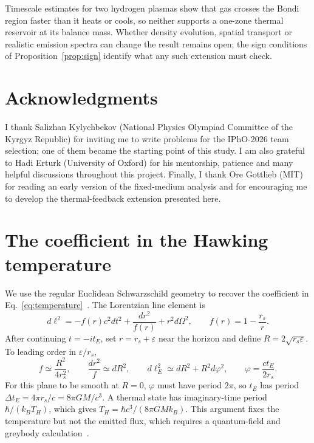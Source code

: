 \documentclass[11pt,a4paper]{article}
\begin{document}
Timescale estimates for two hydrogen plasmas show that gas crosses the Bondi region faster than it heats or cools, so neither supports a one-zone thermal reservoir at its balance mass. Whether density evolution, spatial transport or realistic emission spectra can change the result remains open; the sign conditions of Proposition~\ref{prop:sign} identify what any such extension must check.

\section*{Acknowledgments}
I thank Salizhan Kylychbekov (National Physics Olympiad Committee of the Kyrgyz Republic) for inviting me to write problems for the IPhO-2026 team selection; one of them became the starting point of this study. I am also grateful to Hadi Erturk (University of Oxford) for his mentorship, patience and many helpful discussions throughout this project. Finally, I thank Ore Gottlieb (MIT) for reading an early version of the fixed-medium analysis and for encouraging me to develop the thermal-feedback extension presented here.

\appendix
\section{The coefficient in the Hawking temperature}\label{app:temperature}
We use the regular Euclidean Schwarzschild geometry to recover the coefficient in Eq.~\eqref{eq:temperature}~\cite{gibbons,genolini}. The Lorentzian line element is
\begin{equation*}
 d\ell^2=-f(r)c^2dt^2+\frac{dr^2}{f(r)}+r^2d\Omega^2,
 \qquad f(r)=1-\frac{r_s}{r}.
\end{equation*}
After continuing $t=-it_E$, set $r=r_s+\varepsilon$ near the horizon and define $R=2\sqrt{r_s\varepsilon}$. To leading order in $\varepsilon/r_s$,
\begin{equation*}
 f\simeq\frac{R^2}{4r_s^2},\qquad
 \frac{dr^2}{f}\simeq dR^2,\qquad
 d\ell_E^2\simeq dR^2+R^2d\varphi^2,
 \qquad\varphi=\frac{ct_E}{2r_s}.
\end{equation*}
For this plane to be smooth at $R=0$, $\varphi$ must have period $2\pi$, so $t_E$ has period $\Delta t_E=4\pi r_s/c=8\pi GM/c^3$. A thermal state has imaginary-time period $\hbar/(k_BT_H)$, which gives $T_H=\hbar c^3/(8\pi GMk_B)$. This argument fixes the temperature but not the emitted flux, which requires a quantum-field and greybody calculation~\cite{hawking,page}.
\end{document}
